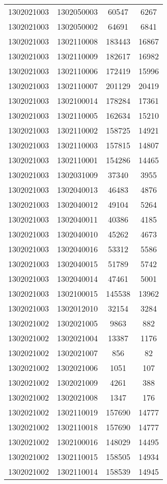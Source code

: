 \begin{longtable}[h]{llcc}
		1302021003 & 1302050003 & 60547 & 6267\\
		1302021003 & 1302050002 & 64691 & 6841\\
		1302021003 & 1302110008 & 183443 & 16867\\
		1302021003 & 1302110009 & 182617 & 16982\\
		1302021003 & 1302110006 & 172419 & 15996\\
		1302021003 & 1302110007 & 201129 & 20419\\
		1302021003 & 1302100014 & 178284 & 17361\\
		1302021003 & 1302110005 & 162634 & 15210\\
		1302021003 & 1302110002 & 158725 & 14921\\
		1302021003 & 1302110003 & 157815 & 14807\\
		1302021003 & 1302110001 & 154286 & 14465\\
		1302021003 & 1302031009 & 37340 & 3955\\
		1302021003 & 1302040013 & 46483 & 4876\\
		1302021003 & 1302040012 & 49104 & 5264\\
		1302021003 & 1302040011 & 40386 & 4185\\
		1302021003 & 1302040010 & 45262 & 4673\\
		1302021003 & 1302040016 & 53312 & 5586\\
		1302021003 & 1302040015 & 51789 & 5742\\
		1302021003 & 1302040014 & 47461 & 5001\\
		1302021003 & 1302100015 & 145538 & 13962\\
		1302021003 & 1302012010 & 32154 & 3284\\
		1302021002 & 1302021005 & 9863 & 882\\
		1302021002 & 1302021004 & 13387 & 1176\\
		1302021002 & 1302021007 & 856 & 82\\
		1302021002 & 1302021006 & 1051 & 107\\
		1302021002 & 1302021009 & 4261 & 388\\
		1302021002 & 1302021008 & 1347 & 176\\
		1302021002 & 1302110019 & 157690 & 14777\\
		1302021002 & 1302110018 & 157690 & 14777\\
		1302021002 & 1302100016 & 148029 & 14495\\
		1302021002 & 1302110015 & 158505 & 14934\\
		1302021002 & 1302110014 & 158539 & 14945\\

\end{longtable}
